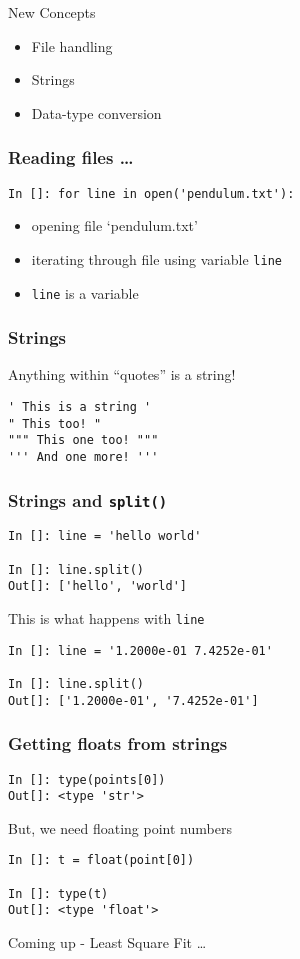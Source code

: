 \documentclass[14pt,compress]{beamer}
\newcommand{\typ}[1]{\lstinline{#1}}
\newcommand{\kwrd}[1]{ \texttt{\textbf{\color{blue}{#1}}}  }
\begin{document}
\begin{frame}{New Concepts}
  \begin{itemize}
    \item File handling
    \item Strings
    \item Data-type conversion
  \end{itemize}
\end{frame}

\begin{frame}[fragile]
  \frametitle{Reading files \ldots}
\typ{In []: for line in open('pendulum.txt'):}
\begin{itemize}
\item opening file `pendulum.txt'
\item iterating through file using variable \typ{line}
\item \typ{line} is a \kwrd{string} variable
\end{itemize}
\end{frame}

\begin{frame}[fragile]
\frametitle{Strings}
Anything within ``quotes'' is a string!
\begin{lstlisting}
' This is a string '  
" This too! "
""" This one too! """
''' And one more! '''
\end{lstlisting}
\end{frame}

\begin{frame}[fragile]
\frametitle{Strings and \typ{split()}}
  \begin{lstlisting}
In []: line = 'hello world'

In []: line.split()
Out[]: ['hello', 'world']
  \end{lstlisting}
This is what happens with \typ{line}
  \begin{lstlisting}
In []: line = '1.2000e-01 7.4252e-01'

In []: line.split()
Out[]: ['1.2000e-01', '7.4252e-01']
  \end{lstlisting}
\end{frame}

\begin{frame}[fragile]
\frametitle{Getting floats from strings}
  \begin{lstlisting}
In []: type(points[0])
Out[]: <type 'str'>
  \end{lstlisting}
But, we need floating point numbers
  \begin{lstlisting}
In []: t = float(point[0])

In []: type(t)
Out[]: <type 'float'>
  \end{lstlisting}
\end{frame}

\begin{frame}[fragile]
\begin{figure}
\end{figure}
\vspace{-0.2in}
Coming up - \alert{Least Square Fit \ldots}
\end{frame}
\end{document}
